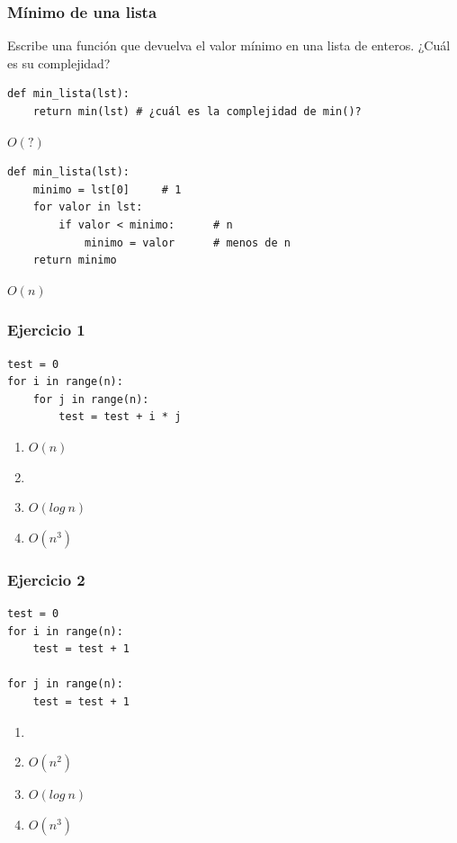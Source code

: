 \documentclass[11pt]{beamer}
\begin{document}
	\begin{frame}\frametitle{Mínimo de una lista}
	\begin{block}{}
	Escribe una función que devuelva el valor mínimo en una lista de enteros. ¿Cuál es su complejidad?
	\end{block}
	\framebreak
	\begin{lstlisting}
def min_lista(lst):
	return min(lst) # ¿cuál es la complejidad de min()?
\end{lstlisting}
	\begin{block}{}
	\centering $O(?)$
	\end{block}
	\framebreak
	\begin{lstlisting}
def min_lista(lst):
	minimo = lst[0]		# 1
	for valor in lst:
		if valor < minimo:		# n
			minimo = valor		# menos de n
	return minimo
\end{lstlisting}
	\begin{block}{}
	\centering $O(n)$
	\end{block}
	\end{frame}



	\begin{frame}[fragile]\frametitle{Ejercicio 1}
	\begin{lstlisting}
test = 0
for i in range(n):
	for j in range(n):
		test = test + i * j
\end{lstlisting}
	\begin{enumerate}
	\item $O(n)$
	\item {}
	\item $O(log\ n)$
	\item $O(n^3)$
	\end{enumerate}
	\end{frame}

	\begin{frame}[fragile]\frametitle{Ejercicio 2}
	\begin{lstlisting}
test = 0
for i in range(n):
	test = test + 1
	
for j in range(n):
	test = test + 1
\end{lstlisting}
	\begin{enumerate}
	\item {}
	\item $O(n^2)$
	\item $O(log\ n)$
	\item $O(n^3)$
	\end{enumerate}
	\end{frame}
\end{document}
